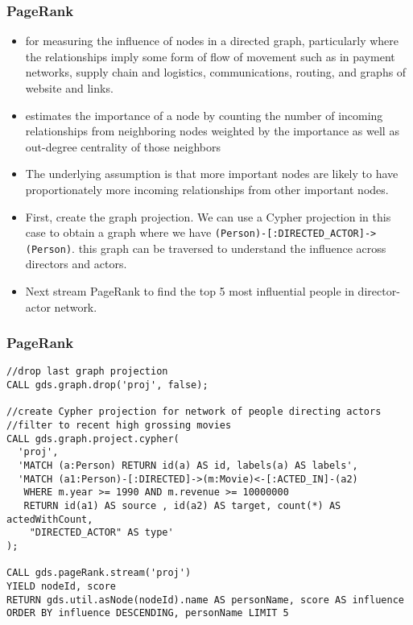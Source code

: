 \begin{frame}[fragile]\frametitle{PageRank}


\begin{itemize}
\item  for measuring the influence of nodes in a directed graph, particularly where the relationships imply some form of flow of movement such as in payment networks, supply chain and logistics, communications, routing, and graphs of website and links.
\item estimates the importance of a node by counting the number of incoming relationships from neighboring nodes weighted by the importance as well as out-degree centrality of those neighbors
\item The underlying assumption is that more important nodes are likely to have proportionately more incoming relationships from other important nodes.
\item First, create the graph projection. We can use a Cypher projection in this case to obtain a graph where we have \lstinline|(Person)-[:DIRECTED_ACTOR]->(Person)|. this graph can be traversed to understand the influence across directors and actors.
\item Next stream PageRank to find the top 5 most influential people in director-actor network.
\end{itemize}


\end{frame}

\begin{frame}[fragile]\frametitle{PageRank}


\begin{lstlisting}
//drop last graph projection
CALL gds.graph.drop('proj', false);

//create Cypher projection for network of people directing actors
//filter to recent high grossing movies
CALL gds.graph.project.cypher(
  'proj',
  'MATCH (a:Person) RETURN id(a) AS id, labels(a) AS labels',
  'MATCH (a1:Person)-[:DIRECTED]->(m:Movie)<-[:ACTED_IN]-(a2)
   WHERE m.year >= 1990 AND m.revenue >= 10000000
   RETURN id(a1) AS source , id(a2) AS target, count(*) AS actedWithCount,
    "DIRECTED_ACTOR" AS type'
);

CALL gds.pageRank.stream('proj')
YIELD nodeId, score
RETURN gds.util.asNode(nodeId).name AS personName, score AS influence
ORDER BY influence DESCENDING, personName LIMIT 5

\end{lstlisting}

\end{frame}

